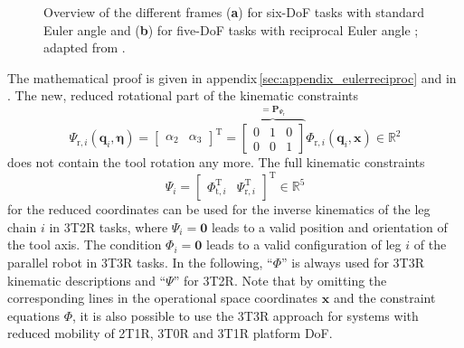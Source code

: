 \documentclass[robotics,article,accept,moreauthors,pdftex]{Definitions/mdpi}
\newcommand{\bm}[1]{\boldsymbol{#1}}
\newcommand{\transp}[0]{{\mathrm{T}}}
\let\Phi\varPhi
\let\Psi\varPsi
\begin{document}
\begin{figure}[H]
    
    \caption{Overview of the different frames (\textbf{a}) for six-DoF tasks with standard Euler angle  and (\textbf{b}) for five-DoF tasks with reciprocal Euler angle ; adapted from \cite{1_SchapplerTapOrt2019}.}
    \label{fig:frames_5dof_6dof}
\end{figure} 

The mathematical proof is given in appendix\,\ref{sec:appendix_eulerreciproc} and in \cite{1_SchapplerTapOrt2019}.
%
The new, reduced rotational part of the kinematic constraints
%
\begin{equation}
\bm{\Psi}_{\mathrm{r},i}(\bm{q}_i,\bm{\eta}) = 
\begin{bmatrix}
\alpha_2 & \alpha_3
\end{bmatrix}^\transp
=
\overbrace{\begin{bmatrix}
    0 & 1 & 0 \\ 
    0 & 0 & 1
    \end{bmatrix}}^{=\bm{P}_{\bm{\Psi}_\mathrm{r}}}
\bm{\Phi}_{\mathrm{r},i} (\bm{q}_i,\bm{x})
\in {\mathbb{R}}^{2}
\label{equ:Psir_def}
\end{equation}
%
does not contain the tool rotation any more.
The full kinematic constraints
%
\begin{equation}
\bm{\Psi}_i=\begin{bmatrix}
\bm{\Phi}_{\mathrm{t},i}^\transp & \bm{\Psi}_{\mathrm{r},i}^\transp
\end{bmatrix}^\transp \in {\mathbb{R}}^{5}
\label{equ:Psi_def}
\end{equation}
%
for the reduced coordinates can be used for the inverse kinematics of the leg chain $i$ in 3T2R tasks, where $\bm{\Psi}_i=\bm{0}$ leads to a valid position and orientation of the tool axis.
The condition $\bm{\Phi}_i=\bm{0}$ leads to a valid configuration of leg $i$ of the parallel robot in 3T3R tasks.
In the following, ``$\bm{\Phi}$'' is always used for 3T3R kinematic descriptions and ``$\bm{\Psi}$'' for 3T2R.
Note that by omitting the corresponding lines in the operational space coordinates $\bm{x}$ and the constraint equations $\bm{\Phi}$, it is also possible to use the 3T3R approach for systems with reduced mobility of 2T1R, 3T0R and 3T1R platform DoF.


\end{document}
